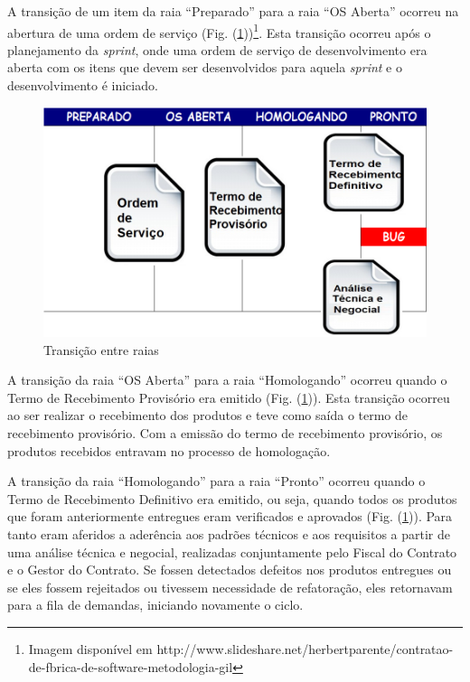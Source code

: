 A transição de um item da raia “Preparado” para a raia “OS Aberta” ocorreu na abertura de uma ordem de serviço (Fig. (\ref{kanban3}))\footnote{Imagem disponível em http://www.slideshare.net/herbertparente/contratao-de-fbrica-de-software-metodologia-gil}. Esta transição ocorreu após o planejamento da \textit{sprint}, onde uma ordem de serviço de desenvolvimento era aberta com os itens que devem ser desenvolvidos para aquela \textit{sprint} e o desenvolvimento é iniciado. 

\begin{figure}[H]
		\centering
		
			\includegraphics[scale=0.5]{figuras/kanbanIPHAN3.png}
		\caption{Transição entre raias}
		\label{kanban3}
\end{figure}

A transição da raia “OS Aberta” para a raia “Homologando” ocorreu quando o Termo de Recebimento Provisório era emitido (Fig. (\ref{kanban3})). Esta transição ocorreu ao ser realizar o recebimento dos produtos e teve como saída o termo de recebimento provisório. Com a emissão do termo de recebimento provisório, os produtos recebidos entravam no processo de homologação. 

A transição da raia “Homologando” para a raia “Pronto” ocorreu quando o Termo de Recebimento Definitivo era emitido, ou seja, quando todos os produtos que foram anteriormente entregues eram verificados e aprovados (Fig. (\ref{kanban3})). Para tanto eram aferidos a aderência aos padrões técnicos e aos requisitos a partir de uma análise técnica e negocial, realizadas conjuntamente pelo Fiscal do Contrato e o Gestor do Contrato. Se fossen detectados defeitos nos produtos entregues ou se eles fossem rejeitados ou tivessem necessidade de refatoração, eles retornavam para a fila de demandas, iniciando novamente o ciclo. 


